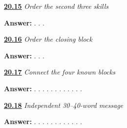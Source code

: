 \noindent\begin{minipage}[t]{\linewidth}
\raggedright
\hyperlink{review-MR-A1M15-skills-block-two-check}{\textbf{20.15}} \emph{Order the second three skills}\par
\small \textbf{Answer:}  .   .   .\par
\end{minipage}\par\medskip

\noindent\begin{minipage}[t]{\linewidth}
\raggedright
\hyperlink{review-MR-A1M16-closing-block-check}{\textbf{20.16}} \emph{Order the closing block}\par
\small \textbf{Answer:} .  .  .\par
\end{minipage}\par\medskip

\noindent\begin{minipage}[t]{\linewidth}
\raggedright
\hyperlink{review-MR-A1M17-guided-message-check}{\textbf{20.17}} \emph{Connect the four known blocks}\par
\small \textbf{Answer:}  .    .   .   .   .    .  .   .   . .  .  .\par
\end{minipage}\par\medskip

\noindent\begin{minipage}[t]{\linewidth}
\raggedright
\hyperlink{review-MR-A1M18-independent-message-check}{\textbf{20.18}} \emph{Independent 30–40-word message}\par
\small \textbf{Answer:}  .    .   .   .   .    .  .   .   . .  .  .\par
\end{minipage}\par\medskip
